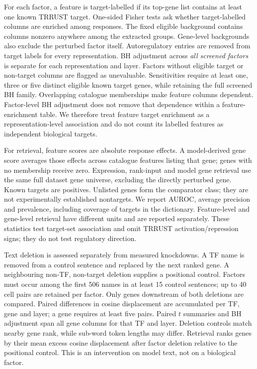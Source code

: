 \documentclass[review,authoryear,12pt]{elsarticle}
\begin{document}
For each factor, a feature is target-labelled if its top-gene list contains at least one known
TRRUST target. One-sided Fisher tests ask whether target-labelled columns are enriched among
responses. The fixed eligible background contains columns nonzero anywhere among the extracted
groups. Gene-level backgrounds also exclude the perturbed factor itself. Autoregulatory entries
are removed from target labels for every representation. BH adjustment across \emph{all screened
factors} is separate for each representation and layer. Factors without eligible target or
non-target columns are flagged as unevaluable. Sensitivities require at least one, three or five
distinct eligible known target genes, while retaining the full screened BH family.
Overlapping catalogue memberships make feature columns dependent. Factor-level BH adjustment
does not remove that dependence within a feature-enrichment table. We therefore treat feature
target enrichment as a representation-level association and do not count its labelled features
as independent biological targets.

For retrieval, feature scores are absolute response effects. A model-derived gene score averages
those effects across catalogue features listing that gene; genes with no membership receive zero.
Expression, rank-input and model gene retrieval use the same full dataset gene universe, excluding
the directly perturbed gene. Known targets are positives. Unlisted genes form the comparator class;
they are not experimentally established nontargets. We report AUROC, average precision and
prevalence, including coverage of targets in the dictionary. Feature-level and gene-level retrieval
have different units and are reported separately. These statistics test target-set association and
omit TRRUST activation/repression signs; they do not test regulatory direction.

Text deletion is assessed separately from measured knockdowns. A TF name is removed from a control
sentence and replaced by the next ranked gene. A neighbouring non-TF, non-target deletion supplies
a positional control. Factors must occur among the first 506 names in at least 15 control sentences;
up to 40 cell pairs are retained per factor. Only genes downstream of both deletions are compared. Paired differences in
cosine displacement are accumulated per TF, gene and layer; a gene requires at least five pairs.
Paired $t$ summaries and BH adjustment span all gene columns for that TF and layer. Deletion controls
match nearby gene rank, while sub-word token lengths may differ. Retrieval ranks genes by their mean
excess cosine displacement after factor deletion relative to the positional control. This is an intervention on model
text, not on a biological factor.
\end{document}

